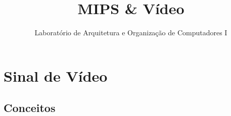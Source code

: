 

\title{MIPS \& Vídeo}

\subtitle{Laboratório de Arquitetura e Organização de Computadores I} %



\begin{frame}
	\titlepage
\end{frame} 



\section{Sinal de Vídeo}

\subsection{Conceitos} 


